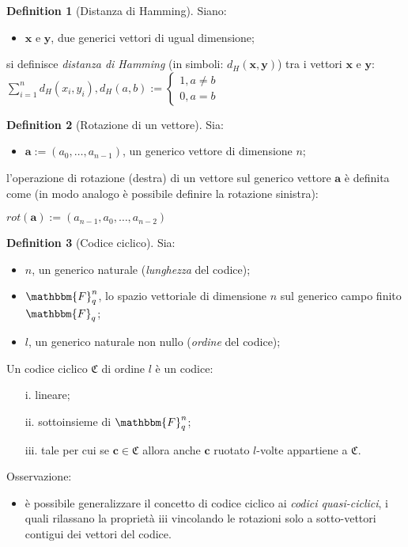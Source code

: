 \documentclass[12pt, a4paper]{report}
\theoremstyle{definition}
\newtheorem{definition}{Definition}[section]
\begin{document}
			\begin{definition}[Distanza di Hamming]
				Siano:
					\begin{itemize}
						\item $\textbf{x}$ e $\textbf{y}$, due generici vettori di ugual dimensione;
					\end{itemize}
				\begin{center}
					si definisce \emph{distanza di Hamming} (in simboli: $d_H(\textbf{x},\textbf{y})$) tra i vettori $\textbf{x}$ e $\textbf{y}$:
					$\sum_{i=1}^{n} d_H(x_i,y_i),d_H(a,b):=
							\begin{cases}
								1, a\neq b \\
								0, a=b
							\end{cases}
						$
				\end{center}
			\end{definition}
			\begin{definition}[Rotazione di un vettore]
				Sia:
				\begin{itemize}
					\item $\textbf{a}:=(a_0,\dots,a_{n-1})$, un generico vettore di dimensione $n$;
				\end{itemize}
				l'operazione di rotazione (destra) di un vettore sul generico vettore $\textbf{a}$ è definita come (in modo analogo è possibile definire la rotazione sinistra):
				\begin{center}
					 $rot(\textbf{a}):=(a_{n-1},a_0,\dots,a_{n-2})$
				\end{center}
			\end{definition}
			\begin{definition}[Codice ciclico]
				Sia:
					\begin{itemize}
						\item $n$, un generico naturale (\emph{lunghezza} del codice);
						\item $\mathbbm{F}_q^n$, lo spazio vettoriale di dimensione $n$ sul generico campo finito $\mathbbm{F}_q$;
						\item $l$, un generico naturale non nullo (\emph{ordine} del codice);
					\end{itemize}
				Un codice ciclico $\mathfrak{C}$ di ordine $l$ è un codice:
				\begin{itemize}
					\item[i.] lineare;
					\item[ii.] sottoinsieme di $\mathbbm{F}_q^n$;
					\item[iii.] tale per cui se $\textbf{c}\in\mathfrak{C}$ allora anche $\textbf{c}$ ruotato $l$-volte appartiene a $\mathfrak{C}$.
				\end{itemize}
				Osservazione:
					\begin{itemize}
						\item è possibile generalizzare il concetto di codice ciclico ai \emph{codici quasi-ciclici}, i quali rilassano la proprietà iii vincolando le rotazioni solo a sotto-vettori contigui dei vettori del codice.
					\end{itemize}
			\end{definition}
\end{document}
